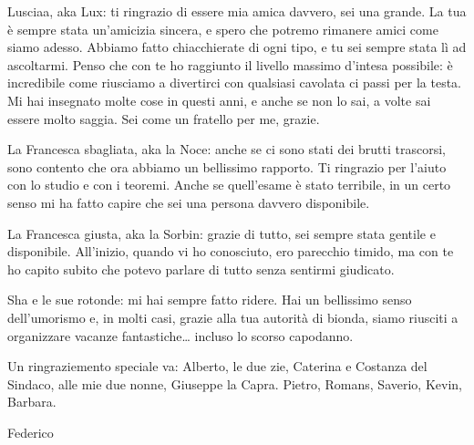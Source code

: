 Lusciaa, aka Lux:
ti ringrazio di essere mia amica davvero, sei una grande.
La tua è sempre stata un’amicizia sincera, e spero che potremo rimanere amici come siamo adesso.
Abbiamo fatto chiacchierate di ogni tipo, e tu sei sempre stata lì ad ascoltarmi.
Penso che con te ho raggiunto il livello massimo d’intesa possibile: è incredibile come riusciamo a divertirci con qualsiasi cavolata ci passi per la testa.
Mi hai insegnato molte cose in questi anni, e anche se non lo sai, a volte sai essere molto saggia.
Sei come un fratello per me, grazie.

La Francesca sbagliata, aka la Noce:
anche se ci sono stati dei brutti trascorsi, sono contento che ora abbiamo un bellissimo rapporto.
Ti ringrazio per l’aiuto con lo studio e con i teoremi.
Anche se quell’esame è stato terribile, in un certo senso mi ha fatto capire che sei una persona davvero disponibile.

La Francesca giusta, aka la Sorbin:
grazie di tutto, sei sempre stata gentile e disponibile.
All’inizio, quando vi ho conosciuto, ero parecchio timido, ma con te ho capito subito che potevo parlare di tutto senza sentirmi giudicato.

Sha e le sue rotonde:
mi hai sempre fatto ridere. Hai un bellissimo senso dell’umorismo e, in molti casi, grazie alla tua autorità di bionda, siamo riusciti a organizzare vacanze fantastiche… incluso lo scorso capodanno.

Un ringraziemento speciale va: Alberto, le due zie, Caterina e Costanza del Sindaco,
alle mie due nonne, Giuseppe la Capra. Pietro, Romans, Saverio, Kevin, Barbara.


\vspace{17mm}

\vs
\begin{flushright}
 Federico
\end{flushright}

